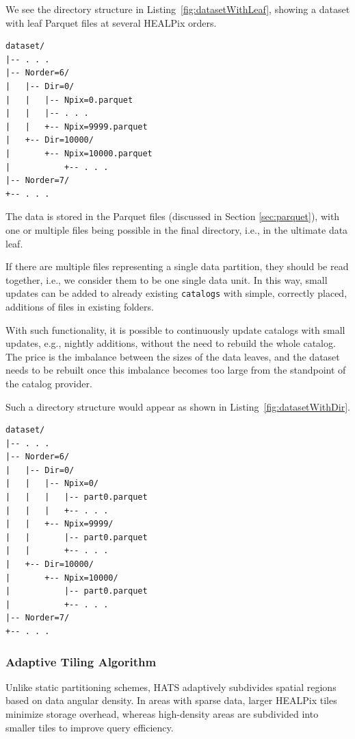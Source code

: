 \documentclass[11pt,a4paper]{ivoa}
\begin{document}
We see the directory structure in Listing~\ref{fig:datasetWithLeaf}, showing a dataset with leaf Parquet files at several HEALPix orders.

\begin{minipage}{\linewidth}
\begin{lstlisting}[caption=Example catalog dataset directory contents, label=fig:datasetWithLeaf]
dataset/
|-- . . .
|-- Norder=6/
|   |-- Dir=0/
|   |   |-- Npix=0.parquet
|   |   |-- . . .
|   |   +-- Npix=9999.parquet
|   +-- Dir=10000/
|       +-- Npix=10000.parquet
|           +-- . . .
|-- Norder=7/
+-- . . .
\end{lstlisting} 
\end{minipage}

The data is stored in the Parquet files (discussed in Section \ref{sec:parquet}), with one or multiple files being possible in the final directory, i.e., in the ultimate data leaf.  \par 
If there are multiple files representing a single data partition, they should be read together, i.e., we consider them to be one single data unit. In this way, small updates can be added to already existing  \texttt{catalogs} with simple, correctly placed, additions of files in existing folders. \par 
With such functionality, it is possible to continuously update catalogs with small updates, e.g., nightly additions, without the need to rebuild the whole catalog. The price is the imbalance between the sizes of the data leaves, and the dataset needs to be rebuilt once this imbalance becomes too large from the standpoint of the catalog provider.


Such a directory structure would appear as shown in Listing~\ref{fig:datasetWithDir}.

\begin{minipage}{\linewidth}
\begin{lstlisting}[caption=Example catalog dataset directory contents with leaf directories, label=fig:datasetWithDir]
dataset/
|-- . . .
|-- Norder=6/
|   |-- Dir=0/
|   |   |-- Npix=0/
|   |   |   |-- part0.parquet
|   |   |   +-- . . .
|   |   +-- Npix=9999/
|   |       |-- part0.parquet
|   |       +-- . . .
|   +-- Dir=10000/
|       +-- Npix=10000/
|           |-- part0.parquet
|           +-- . . .
|-- Norder=7/
+-- . . .
\end{lstlisting} 
\end{minipage} 

\subsubsection{Adaptive Tiling Algorithm} \label{sec:adaptive}
Unlike static partitioning schemes, HATS adaptively subdivides spatial regions based on data angular density. 
In areas with sparse data, larger HEALPix tiles minimize storage overhead, whereas high-density areas are subdivided into smaller tiles to improve query efficiency. \par
\end{document}
